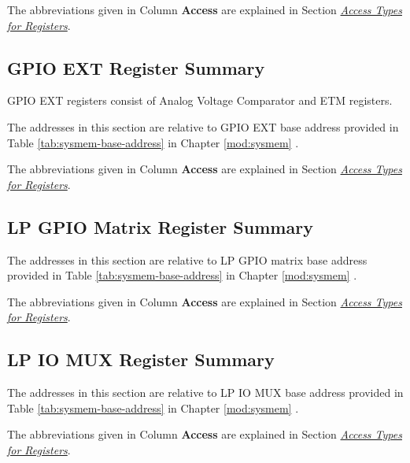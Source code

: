 \documentclass[main\_\_EN.tex]{subfiles}
\begin{document}
The abbreviations given in Column \textbf{Access} are explained in Section \hyperref[glossary-access-types]{\textit{Access Types for Registers}}.




\subsection{GPIO EXT Register Summary}

GPIO EXT registers consist of Analog Voltage Comparator and ETM registers.

The addresses in this section are relative to GPIO EXT base address provided in Table \ref{tab:sysmem-base-address} in Chapter \ref{mod:sysmem} \textit{}.

The abbreviations given in Column \textbf{Access} are explained in Section \hyperref[glossary-access-types]{\textit{Access Types for Registers}}.



\subsection{LP GPIO Matrix Register Summary}
\label{sec:lp-gpio-register-summ}
The addresses in this section are relative to LP GPIO matrix base address provided in Table \ref{tab:sysmem-base-address} in Chapter \ref{mod:sysmem} \textit{}.

The abbreviations given in Column \textbf{Access} are explained in Section \hyperref[glossary-access-types]{\textit{Access Types for Registers}}.



\subsection{LP IO MUX Register Summary}
\label{sec:lp-iomux-register-summ}

The addresses in this section are relative to LP IO MUX base address provided in Table \ref{tab:sysmem-base-address} in Chapter \ref{mod:sysmem} \textit{}.

The abbreviations given in Column \textbf{Access} are explained in Section \hyperref[glossary-access-types]{\textit{Access Types for Registers}}.


\end{document}
